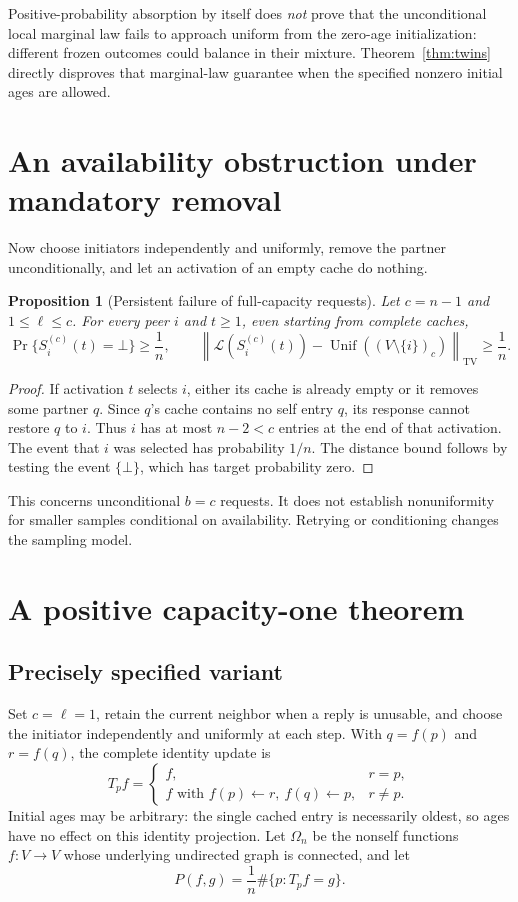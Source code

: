 \documentclass[11pt]{article}
\newtheorem{proposition}[theorem]{Proposition}
\newcommand{\TV}{\mathrm{TV}}
\newcommand{\Unif}{\operatorname{Unif}}
\newcommand{\Law}{\mathcal L}
\begin{document}
Positive-probability absorption by itself does \emph{not} prove that
the unconditional local marginal law fails to approach uniform from
the zero-age initialization: different frozen outcomes could balance
in their mixture. Theorem~\ref{thm:twins} directly disproves that
marginal-law guarantee when the specified nonzero initial ages are
allowed.

\section{An availability obstruction under mandatory removal}

Now choose initiators independently and uniformly, remove the partner
unconditionally, and let an activation of an empty cache do nothing.

\begin{proposition}[Persistent failure of full-capacity requests]
\label{prop:availability}
Let $c=n-1$ and $1\le\ell\le c$. For every peer $i$ and $t\ge1$,
even starting from complete caches,
\[
 \Pr\{S_i^{(c)}(t)=\bot\}\ge\frac1n,\qquad
 \left\|\Law(S_i^{(c)}(t))
       -\Unif((V\setminus\{i\})_c)\right\|_{\TV}\ge\frac1n.
\]
\end{proposition}
\begin{proof}
If activation $t$ selects $i$, either its cache is already empty or
it removes some partner $q$. Since $q$'s cache contains no self entry
$q$, its response cannot restore $q$ to $i$. Thus $i$ has at most
$n-2<c$ entries at the end of that activation. The event that $i$ was
selected has probability $1/n$. The distance bound follows by testing
the event $\{\bot\}$, which has target probability zero.
\end{proof}

This concerns unconditional $b=c$ requests. It does not establish
nonuniformity for smaller samples conditional on availability.
Retrying or conditioning changes the sampling model.

\section{A positive capacity-one theorem}

\subsection{Precisely specified variant}
Set $c=\ell=1$, retain the current neighbor when a reply is unusable,
and choose the initiator independently and uniformly at each step.
With $q=f(p)$ and $r=f(q)$, the complete identity update is
\begin{equation}
 T_p f=
 \begin{cases}
 f,&r=p,\\
 f\text{ with }f(p)\gets r,\ f(q)\gets p,&r\ne p.
 \end{cases}
 \label{eq:kernel}
\end{equation}
Initial ages may be arbitrary: the single cached entry is necessarily
oldest, so ages have no effect on this identity projection.
Let $\Omega_n$ be the nonself functions $f:V\to V$ whose underlying
undirected graph is connected, and let
\[
 P(f,g)=\frac1n\#\{p:T_p f=g\}.
\]
\end{document}
